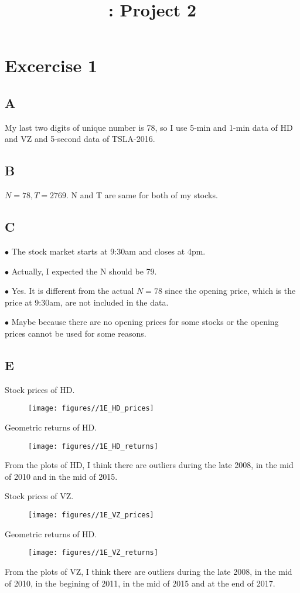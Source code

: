 \documentclass{report}
\title{\LectureTitle: Project 2}
\begin{document}
\maketitle
\newpage

\section{ Excercise 1}

\subsection{A}
My last two digits of unique number is 78, so I use 5-min and 1-min data of HD and VZ and 5-second data of TSLA-2016.

\subsection{B}
$ N = 78, T = 2769$.  N and T are same for both of my stocks.

\subsection{C}

$\bullet$ The stock market starts at 9:30am and closes at 4pm. 

$\bullet$ Actually, I expected the N should be 79.

$\bullet$ Yes. It is different from the actual $N=78$ since the opening price, which is the price at 9:30am, are not included in the data. 

$\bullet$ Maybe because there are no opening prices for some stocks or the opening prices cannot be used for some reasons.

\subsection{E}
Stock prices of HD.
\begin{figure}[H]
        \centering 
         \texttt{[image: figures//1E\_HD\_prices]}
\end{figure}
Geometric returns of HD.
\begin{figure}[H]
        \centering 
         \texttt{[image: figures//1E\_HD\_returns]}
\end{figure}
From the plots of HD, I think there are outliers during the late 2008, in the mid of 2010 and in the mid of 2015.

Stock prices of VZ.
\begin{figure}[H]
        \centering 
         \texttt{[image: figures//1E\_VZ\_prices]}
\end{figure}
Geometric returns of HD.
\begin{figure}[H]
        \centering 
         \texttt{[image: figures//1E\_VZ\_returns]}
\end{figure}
From the plots of VZ, I think there are outliers during the late 2008, in the mid of 2010, in the begining of 2011, in the mid of 2015 and at the end of 2017.
\end{document}
